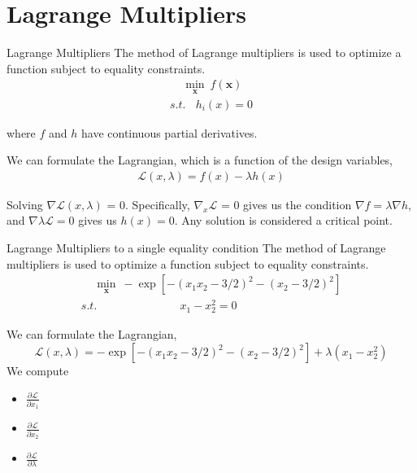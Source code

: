 \documentclass{beamer}
\begin{document}
\section{Lagrange Multipliers}
\begin{frame}{Lagrange Multipliers}
The method of Lagrange multipliers is used to optimize a function subject to equality
constraints. 
\begin{gather*}
    ~~~~~ \underset{\boldsymbol{x}}{\min} ~ f(\boldsymbol{x})\\
    {s.t.}~~~~ h_i(x) = 0 
\end{gather*}

where $f$ and $h$ have continuous partial derivatives.

We can formulate the Lagrangian, which is a function of the design variables,
\begin{gather*}
    \mathcal{L}(x, \lambda) = f(x) - \lambda h(x) 
\end{gather*}

Solving $\nabla \mathcal{L}(x, \lambda)$ = 0. Specifically, $\nabla_x \mathcal{L}$ = 0 gives us the condition $\nabla f= \lambda \nabla h$, and $\nabla \lambda \mathcal{L}=0$ gives us $h(x)=0$. Any solution is considered a critical point.

\end{frame}

\begin{frame}{Lagrange Multipliers to a single equality condition}
The method of Lagrange multipliers is used to optimize a function subject to equality
constraints. 
\begin{gather*}
    ~~~~~ \underset{\boldsymbol{x}}{\min} ~ -\exp[-(x_1x_2-3/2)^2 - (x_2-3/2)^2] \\
    {s.t.}~~~~~~~~~~~~~~~~~~~~~~~~~~~~~~~~~ x_1 - x_2^2 = 0 
\end{gather*}

We can formulate the Lagrangian, 
\begin{equation*}
    \mathcal{L}(x, \lambda) = -\exp[-(x_1x_2-3/2)^2 - (x_2-3/2)^2] + \lambda(x_1 - x_2^2)
\end{equation*}
We compute
\begin{itemize}
    \item $\frac{\partial \mathcal{L}}{\partial x_1}$
    \item $\frac{\partial \mathcal{L}}{\partial x_2}$
    \item $\frac{\partial \mathcal{L}}{\partial \lambda}$
\end{itemize}

\end{frame}
\end{document}
